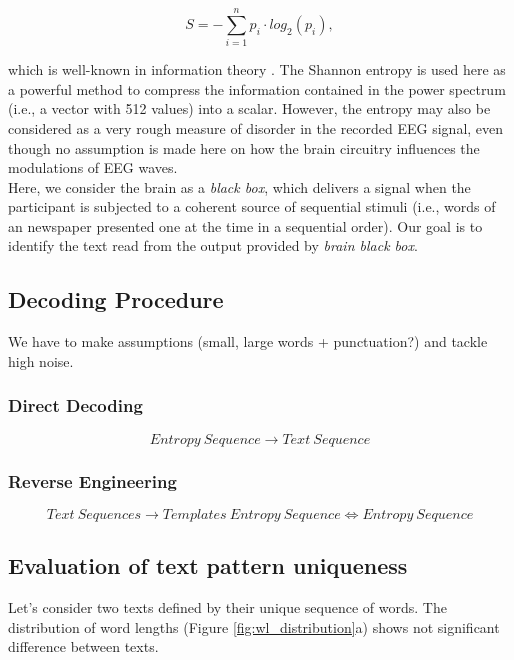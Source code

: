 \begin{equation}
\label{eq:shannon}
S = - \sum_{i=1}^n p_i\cdot log_{2}(p_i),
\end{equation}

which is well-known in information theory \cite{}. The Shannon entropy is used here as a powerful method to compress the information contained in the power spectrum (i.e., a vector with 512 values) into a scalar. However,  the entropy may also be considered as a very rough measure of disorder in the recorded EEG signal, even though no assumption is made here on how the brain circuitry influences the modulations of EEG waves.\\

Here, we consider the brain as a {\it black box}, which delivers a signal when the participant is subjected to a coherent source of sequential stimuli (i.e., words of an newspaper presented one at the time in a sequential order). Our goal is to identify the text read from the output provided by {\it brain black box}.

\subsection{Decoding Procedure}
We have to make assumptions (small, large words + punctuation?) and tackle high noise.


\subsubsection{Direct Decoding}

\begin{equation}
Entropy~Sequence \rightarrow Text~Sequence
\end{equation}

\subsubsection{Reverse Engineering}

\begin{equation}
Text~Sequences \rightarrow Templates~Entropy~Sequence \Longleftrightarrow Entropy~Sequence  
\end{equation}

\subsection{Evaluation of text pattern uniqueness}

Let's consider two texts defined by their unique sequence of words. The distribution of word lengths (Figure \ref{fig:wl_distribution}a) shows not significant difference between texts. 

